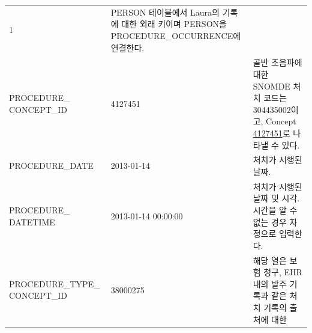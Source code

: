 \documentclass[11pt]{book}
\theoremstyle{definition}
\theoremstyle{definition}
\theoremstyle{definition}
\theoremstyle{remark}
\begin{document}
\begin{longtable}[]{@{}lll@{}}
\begin{minipage}[t]{0.16\columnwidth}
1\strut
\end{minipage} & \begin{minipage}[t]{0.48\columnwidth}\raggedright\strut
PERSON 테이블에서 Laura의 기록에 대한 외래 키이며 PERSON을
PROCEDURE\_OCCURRENCE에 연결한다.\strut
\end{minipage}\tabularnewline
\begin{minipage}[t]{0.28\columnwidth}\raggedright\strut
PROCEDURE\_ CONCEPT\_ID\strut
\end{minipage} & \begin{minipage}[t]{0.16\columnwidth}\raggedright\strut
4127451\strut
\end{minipage} & \begin{minipage}[t]{0.48\columnwidth}\raggedright\strut
골반 초음파에 대한 SNOMDE 처치 코드는 304435002이고, Concept
\href{http://athena.ohdsi.org/search-terms/terms/4127451}{4127451}로
나타낼 수 있다.\strut
\end{minipage}\tabularnewline
\begin{minipage}[t]{0.28\columnwidth}\raggedright\strut
PROCEDURE\_DATE\strut
\end{minipage} & \begin{minipage}[t]{0.16\columnwidth}\raggedright\strut
2013-01-14\strut
\end{minipage} & \begin{minipage}[t]{0.48\columnwidth}\raggedright\strut
처치가 시행된 날짜.\strut
\end{minipage}\tabularnewline
\begin{minipage}[t]{0.28\columnwidth}\raggedright\strut
PROCEDURE\_ DATETIME\strut
\end{minipage} & \begin{minipage}[t]{0.16\columnwidth}\raggedright\strut
2013-01-14 00:00:00\strut
\end{minipage} & \begin{minipage}[t]{0.48\columnwidth}\raggedright\strut
처치가 시행된 날짜 및 시각. 시간을 알 수 없는 경우 자정으로
입력한다.\strut
\end{minipage}\tabularnewline
\begin{minipage}[t]{0.28\columnwidth}\raggedright\strut
PROCEDURE\_TYPE\_ CONCEPT\_ID\strut
\end{minipage} & \begin{minipage}[t]{0.16\columnwidth}\raggedright\strut
38000275\strut
\end{minipage} & \begin{minipage}[t]{0.48\columnwidth}\raggedright\strut
해당 열은 보험 청구, EHR내의 발주 기록과 같은 처치 기록의 출처에 대한

\end{minipage}
\end{longtable}
\end{document}
